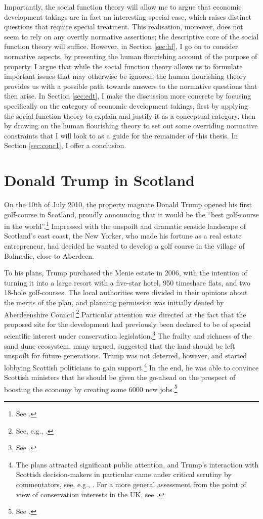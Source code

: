 Importantly, the social function theory will allow me to argue that economic development takings are in fact an interesting special case, which raises distinct questions that require special treatment. This realisation, moreover, does not seem to rely on any overtly normative assertions; the descriptive core of the social function theory will suffice. However, in Section \ref{sec:hf}, I go on to consider normative aspects, by presenting the human flourishing account of the purpose of property. I argue that while the social function theory allows us to formulate important issues that may otherwise be ignored, the human flourishing theory provides us with a possible path towards answers to the normative questions that then arise. In Section \ref{sec:edt}, I make the discussion more concrete by focusing specifically on the category of economic development takings, first by applying the social function theory to explain and justify it as a conceptual category, then by drawing on the human flourishing theory to set out some overriding normative constraints that I will look to as a guide for the remainder of this thesis. In Section \ref{sec:conc1}, I offer a conclusion.

\section{Donald Trump in Scotland}\label{sec:dts}

On the 10th of July 2010, the property magnate Donald Trump opened his first golf-course in Scotland, proudly announcing that it would be the ``best golf-course in the world''.\footnote{See \cite{passow12}.} Impressed with the unspoilt and dramatic seaside landscape of Scotland's east coast, the New Yorker, who made his fortune as a real estate entrepreneur, had decided he wanted to develop a golf course in the village of Balmedie, close to Aberdeen.

To  his plans, Trump purchased the Menie estate in 2006, with the intention of turning it into a large resort with a five-star hotel, 950 timeshare flats, and two 18-hole golf-courses. The local authorities were divided in their opinions about the merits of the plan, and planning permission was initially denied by Aberdeenshire Council.\footnote{See, e.g., \cite{bbc07}.} Particular attention was directed at the fact that the proposed site for the development had previously been declared to be of special scientific interest under conservation legislation.\footnote{See \cite{bbc07b}.} The frailty and richness of the sand dune ecosystem, many argued, suggested that the land should be left unspoilt for future generations. Trump was not deterred, however, and started lobbying Scottish politicians to gain support.\footnote{The plans attracted significant public attention, and Trump's interaction with Scottish decision-makers in particular came under critical scrutiny by commentators, see, e.g., \cite{jenkins08}. For a more general assessment from the point of view of conservation interests in the UK, see \cite{koen13}.} In the end, he was able to convince Scottish ministers that he should be given the go-ahead on the prospect of boosting the economy by creating some 6000 new jobs.\footnote{See \cite{carrell08}.}

